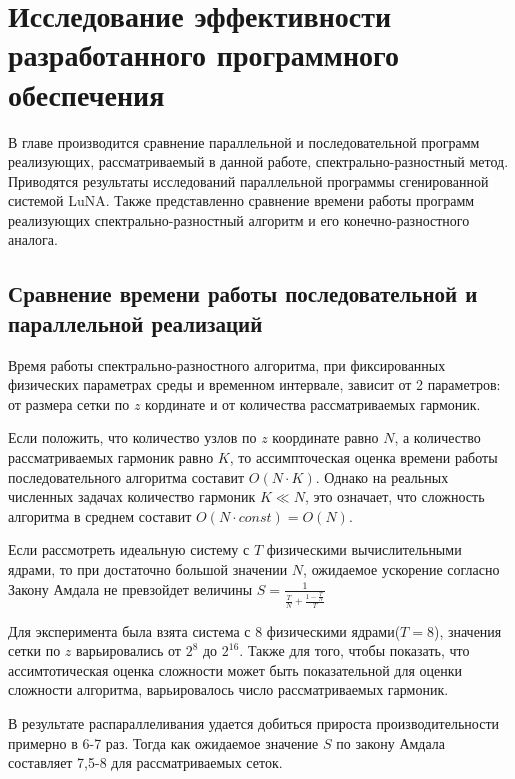 \section{Исследование эффективности разработанного программного обеспечения}

В главе производится сравнение параллельной и последовательной программ реализующих,
рассматриваемый в данной работе, спектрально-разностный метод.
Приводятся результаты исследований параллельной программы сгенированной системой LuNA.
Также представленно сравнение времени работы программ реализующих спектрально-разностный алгоритм
и его конечно-разностного аналога.

\subsection{Сравнение времени работы последовательной и параллельной реализаций}

Время работы спектрально-разностного алгоритма, при фиксированных физических параметрах среды и временном интервале,
зависит от 2 параметров: от размера сетки по $z$ кординате и от количества рассматриваемых гармоник.

Если положить, что количество узлов по $z$ координате равно $N$, а количество рассматриваемых гармоник равно $K$,
то ассимпточеская оценка времени работы последовательного алгоритма составит $O(N\cdot K)$. Однако на реальных численных задачах
количество гармоник $K \ll N$, это означает, что сложность алгоритма в среднем составит $O(N \cdot const)=O(N)$.

Если рассмотреть идеальную систему с $T$ физическими вычислительными ядрами, то при достаточно большой значении $N$,
ожидаемое ускорение согласно Закону Амдала не превзойдет величины $S = \frac{1}{\frac{T}{N} + \frac{1-\frac{T}{N}}{T}}$

Для эксперимента была взята система с 8 физическими ядрами($T=8$), значения сетки по $z$ варьировались от $2^8$ до $2^{16}$.
Также для того, чтобы показать, что ассимтотическая оценка сложности может быть показательной для оценки сложности алгоритма,
варьировалось число рассматриваемых гармоник.


В результате распараллеливания удается добиться прироста производительности примерно в 6-7 раз. Тогда как
ожидаемое значение $S$ по закону Амдала составляет 7,5-8 для рассматриваемых сеток.

